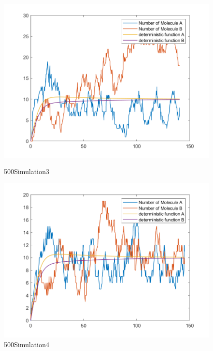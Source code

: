 \documentclass{article}
\begin{document}
\begin{figure}[htbp]
    \centering
    \begin{minipage}{0.45\linewidth}
        \centering
        \includegraphics[width=\linewidth]{graph/a3.png}
        \caption{500Simulation3}
        \label{a3}
    \end{minipage}
    \hfill
    \begin{minipage}{0.45\linewidth}
        \centering
        \includegraphics[width=\linewidth]{graph/a4.png}
        \caption{500Simulation4}
        \label{a4}
    \end{minipage}
\end{figure}
\end{document}
